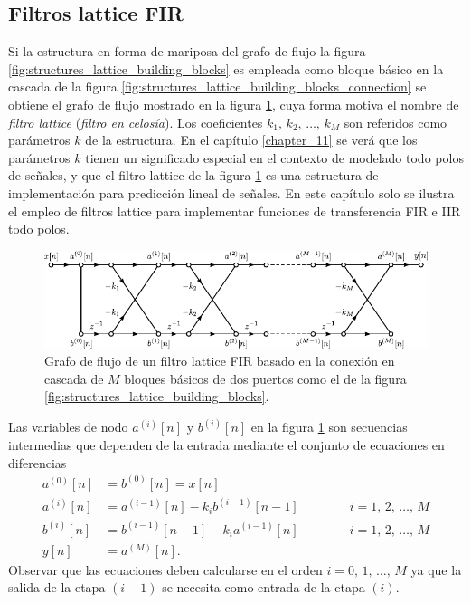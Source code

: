 \documentclass[a4paper]{report}
\begin{document}
\subsection{Filtros lattice FIR}\label{sec:structures_lattice_fir}

Si la estructura en forma de mariposa del grafo de flujo la figura \ref{fig:structures_lattice_building_blocks} es empleada como bloque básico en la cascada de la figura \ref{fig:structures_lattice_building_blocks_connection} se obtiene el grafo de flujo mostrado en la figura \ref{fig:structures_lattice_building_blocks_connection_fir}, cuya forma motiva el nombre de \emph{filtro lattice} (\emph{filtro en celosía}). Los coeficientes \(k_1,\,k_2,\,\dots,\, k_M\) son referidos como parámetros \(k\) de la estructura. En el capítulo \ref{chapter_11} se verá que los parámetros \(k\) tienen un significado especial en el contexto de modelado todo polos de señales, y que el filtro lattice de la figura \ref{fig:structures_lattice_building_blocks_connection_fir} es una estructura de implementación para predicción lineal de señales. En este capítulo solo se ilustra el empleo de filtros lattice para implementar funciones de transferencia FIR e IIR todo polos.
\begin{figure}[!htb]
 \begin{center}
 \includegraphics[width=1\textwidth]{figuras/structures_lattice_building_blocks_connection_fir.pdf}
 \caption{\label{fig:structures_lattice_building_blocks_connection_fir} Grafo de flujo de un filtro lattice FIR basado en la conexión en cascada de \(M\) bloques básicos de dos puertos como el de la figura \ref{fig:structures_lattice_building_blocks}.}
 \end{center}
\end{figure}

Las variables de nodo \(a^{(i)}[n]\) y \(b^{(i)}[n]\) en la figura \ref{fig:structures_lattice_building_blocks_connection_fir} son secuencias intermedias que dependen de la entrada mediante el conjunto de ecuaciones en diferencias 
\begin{equation}\label{eq:structures_lattice_difference_equations_set_general}
 \begin{aligned}
  a^{(0)}[n]&=b^{(0)}[n]=x[n]\\
  a^{(i)}[n]&=a^{(i-1)}[n]-k_ib^{(i-1)}[n-1]
  \qquad\qquad i=1,\,2,\,\dots,\,M\\
  b^{(i)}[n]&=b^{(i-1)}[n-1]-k_ia^{(i-1)}[n]
  \qquad\qquad i=1,\,2,\,\dots,\,M\\
  y[n]&=a^{(M)}[n].
 \end{aligned}
\end{equation}
Observar que las ecuaciones deben calcularse en el orden \(i=0,\,1,\,\dots,\,M\) ya que  la salida de la etapa \((i-1)\) se necesita como entrada de la etapa \((i)\).
\end{document}

